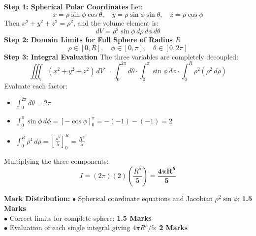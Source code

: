 \begin{solutionbox}
\textbf{Step 1: Spherical Polar Coordinates}
Let:
\[
x = \rho \sin\phi \cos\theta, \quad y = \rho \sin\phi \sin\theta, \quad z = \rho \cos\phi
\]
Then $x^2 + y^2 + z^2 = \rho^2$, and the volume element is:
\[
dV = \rho^2 \sin\phi \, d\rho \, d\phi \, d\theta
\]
\textbf{Step 2: Domain Limits for Full Sphere of Radius $R$}
\[
\rho \in [0, R], \quad \phi \in [0, \pi], \quad \theta \in [0, 2\pi]
\]
\textbf{Step 3: Integral Evaluation}
The three variables are completely decoupled:
\[
\iiint_V (x^2+y^2+z^2) \, dV = \int_0^{2\pi} d\theta \cdot \int_0^\pi \sin\phi \, d\phi \cdot \int_0^R \rho^2 (\rho^2 \, d\rho)
\]
Evaluate each factor:
\begin{itemize}[leftmargin=6mm]
    \item $\int_0^{2\pi} d\theta = 2\pi$
    \item $\int_0^\pi \sin\phi \, d\phi = [-\cos\phi]_0^\pi = -(-1) - (-1) = 2$
    \item $\int_0^R \rho^4 \, d\rho = \left[ \frac{\rho^5}{5} \right]_0^R = \frac{R^5}{5}$
\end{itemize}
Multiplying the three components:
\[
I = (2\pi)(2)\left(\frac{R^5}{5}\right) = \mathbf{\frac{4\pi R^5}{5}}
\]

\begin{markingrubric}
\textbf{Mark Distribution:}
$\bullet$ Spherical coordinate equations and Jacobian $\rho^2 \sin\phi$: \textbf{1.5 Marks}\\
$\bullet$ Correct limits for complete sphere: \textbf{1.5 Marks}\\
$\bullet$ Evaluation of each single integral giving $4\pi R^5/5$: \textbf{2 Marks}
\end{markingrubric}
\end{solutionbox}

\newpage

